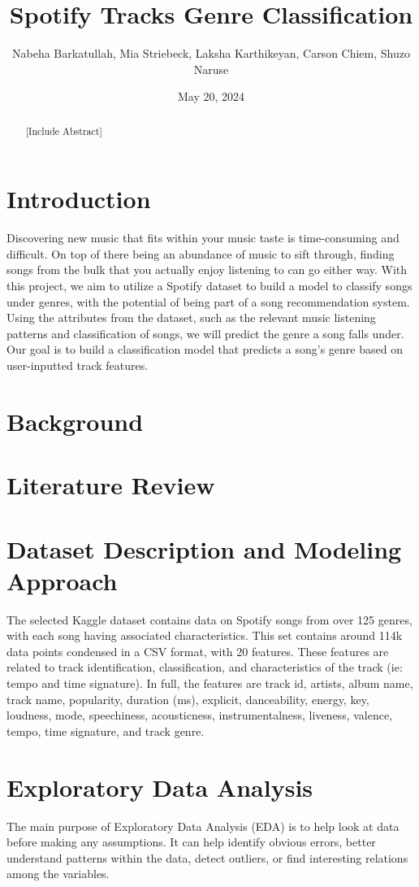 \documentclass[times, twocolumn]{article}
\title{Spotify Tracks Genre Classification}
\author{Nabeha Barkatullah, Mia Striebeck, Laksha Karthikeyan, Carson Chiem, Shuzo Naruse}
\date{May 20, 2024}
\begin{document}
\maketitle

\newpage
\begin{abstract}
    [Include Abstract]
\end{abstract}
\section{Introduction}
Discovering new music that fits within your music taste is time-consuming and difficult. On top of there being an abundance of music to sift through, finding songs from the bulk that you actually enjoy listening to can go either way. With this project, we aim to utilize a Spotify dataset to build a model to classify songs under genres, with the potential of being part of a song recommendation system. Using the attributes from the dataset, such as the relevant music listening patterns and classification of songs, we will predict the genre a song falls under. Our goal is to build a classification model that predicts a song’s genre based on user-inputted track features.
\section{Background}
\section{Literature Review}

\section{Dataset Description and Modeling Approach}
The selected Kaggle dataset contains data on Spotify songs from over 125 genres, with each song having associated characteristics. This set contains around 114k data points condensed in a CSV format, with 20 features. These features are related to track identification, classification, and characteristics of the track (ie: tempo and time signature). In full, the features are track id, artists, album name, track name, popularity, duration (ms), explicit, danceability, energy, key, loudness, mode, speechiness, acousticness, instrumentalness, liveness, valence, tempo, time signature, and track genre.

\section{Exploratory Data Analysis}
The main purpose of Exploratory Data Analysis (EDA) is to help look at data before making any assumptions. It can help identify obvious errors, better understand patterns within the data, detect outliers, or find interesting relations among the variables.
\end{document}
